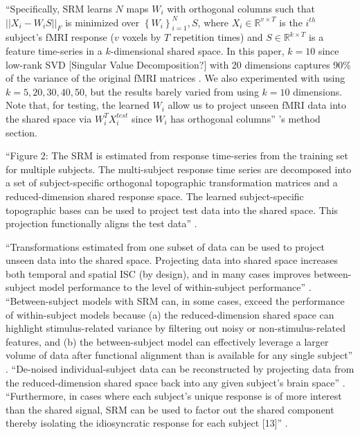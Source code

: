 ``Specifically, SRM learns $N$ maps $W_{i}$ with orthogonal columns such that
$||X_{i}-W_{i}S||_{F}$ is minimized over $\left\{ W_{i}\right\} _{i=1}^{N},S$,
where $X_{i}\in\mathbb{R}^{v\times{T}}$ is the $i^{th}$ subject's fMRI response
($v$ voxels by $T$ repetition times) and $S\in\mathbb{R}^{k\times{T}}$ is a
feature time-series in a $k$-dimensional shared space. In this paper, $k=10$
since low-rank SVD [Singular Value Decomposition?] with 20 dimensions captures
90\% of the variance of the original fMRI matrices \citep{chen2015reduced}. We
also experimented with using $k=5,20,30,40,50$, but the results barely varied
from using $k=10$ dimensions.  Note that, for testing, the learned $W_{i}$ allow
us to project unseen fMRI data into the shared space via $W_{i}^{T}X_{i}^{test}$
since $W_{i}$ has orthogonal columns'' \citep{vodrahalli2018mapping}'s method
section.

%
``Figure 2: The SRM is estimated from response time-series from the training set
for multiple subjects. The multi-subject response time series are decomposed
into a set of subject-specific orthogonal topographic transformation matrices
and a reduced-dimension shared response space. The learned subject-specific
topographic bases can be used to project test data into the shared space. This
projection functionally aligns the test data'' \citep{kumar2020brainiak}.

%
``Transformations estimated from one subset of data can be used to project
unseen data into the shared space. Projecting data into shared space increases
both temporal and spatial ISC (by design), and in many cases improves
between-subject model performance to the level of within-subject performance''
\citep{kumar2020brainiak}.
%
``Between-subject models with SRM can, in some cases, exceed the performance of
within-subject models because (a) the reduced-dimension shared space can
highlight stimulus-related variance by filtering out noisy or
non-stimulus-related features, and (b) the between-subject model can effectively
leverage a larger volume of data after functional alignment than is available
for any single subject'' \citep{kumar2020brainiak}.
%
``De-noised individual-subject data can be reconstructed by projecting data from
the reduced-dimension shared space back into any given subject’s brain space''
\citep{kumar2020brainiak}.
%
``Furthermore, in cases where each subject's unique response is of more interest
than the shared signal, SRM can be used to factor out the shared component
thereby isolating the idiosyncratic response for each subject [13]''
\citep{kumar2020brainiak}.


